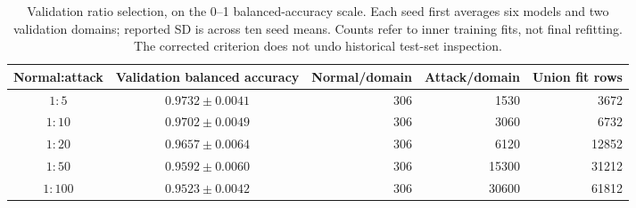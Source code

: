 \begin{table}[p]
\centering
\caption{Validation ratio selection, on the 0--1 balanced-accuracy scale. Each seed first averages six models and two validation domains; reported SD is across ten seed means. Counts refer to inner training fits, not final refitting. The corrected criterion does not undo historical test-set inspection.}
\label{tab:supp-ratio-selection}
\footnotesize
\setlength{\tabcolsep}{6pt}
\begin{tabular}{ccrrr}
\toprule
Normal:attack & Validation balanced accuracy & Normal/domain & Attack/domain & Union fit rows \\
\midrule
$1:5$ & $0.9732 \pm 0.0041$ & 306 & 1530 & 3672 \\
$1:10$ & $0.9702 \pm 0.0049$ & 306 & 3060 & 6732 \\
$1:20$ & $0.9657 \pm 0.0064$ & 306 & 6120 & 12852 \\
$1:50$ & $0.9592 \pm 0.0060$ & 306 & 15300 & 31212 \\
$1:100$ & $0.9523 \pm 0.0042$ & 306 & 30600 & 61812 \\
\bottomrule
\end{tabular}
\end{table}
